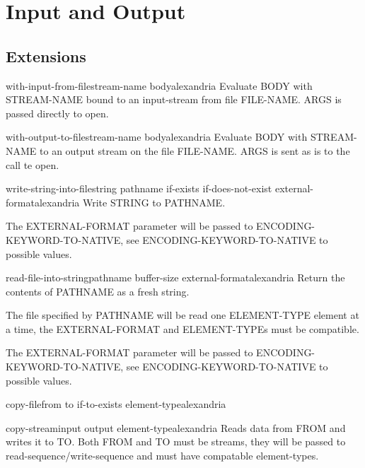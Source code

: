 \chapter{Input and Output}





\section{Extensions}
\label{sec:extensions}

\begin{macro}{with-input-from-file}{stream-name \body body}{alexandria}{}
  Evaluate BODY with STREAM-NAME bound to an input-stream from file
FILE-NAME. ARGS is passed directly to open.
\end{macro}

\begin{macro}{with-output-to-file}{stream-name \body body}{alexandria}{}
  Evaluate BODY with STREAM-NAME to an output stream on the file
FILE-NAME. ARGS is sent as is to the call te open.
\end{macro}

\begin{function}{write-string-into-file}{string pathname \key if-exists if-does-not-exist external-format}{alexandria}{}
  Write STRING to PATHNAME.

The EXTERNAL-FORMAT parameter will be passed to
ENCODING-KEYWORD-TO-NATIVE, see ENCODING-KEYWORD-TO-NATIVE to
possible values.
\end{function}

\begin{function}{read-file-into-string}{pathname \key buffer-size external-format}{alexandria}{}
  Return the contents of PATHNAME as a fresh string.

The file specified by PATHNAME will be read one ELEMENT-TYPE
element at a time, the EXTERNAL-FORMAT and ELEMENT-TYPEs must be
compatible.

The EXTERNAL-FORMAT parameter will be passed to
ENCODING-KEYWORD-TO-NATIVE, see ENCODING-KEYWORD-TO-NATIVE to
possible values.
\end{function}

\begin{function}{copy-file}{from to \key if-to-exists element-type}{alexandria}{}
  
\end{function}

\begin{function}{copy-stream}{input output \op element-type}{alexandria}{}
  Reads data from FROM and writes it to TO. Both FROM and TO must be streams,
they will be passed to read-sequence/write-sequence and must have compatable
element-types.
\end{function}


